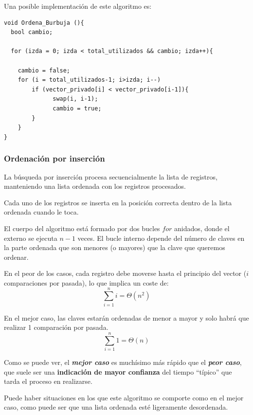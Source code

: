 \documentclass[10pt,a4paper,spanish]{report}
\theoremstyle{definition}
\theoremstyle{remark}
\begin{document}
 Una posible implementación de este algoritmo es:

 \begin{verbatim}
void Ordena_Burbuja (){
  bool cambio;

  for (izda = 0; izda < total_utilizados && cambio; izda++){

    cambio = false;
    for (i = total_utilizados-1; i>izda; i--)
        if (vector_privado[i] < vector_privado[i-1]){
              swap(i, i-1);
              cambio = true;
        }
    }
}
\end{verbatim}

\subsubsection{\textcolor[rgb]{0.2,0.5,0.5}Ordenación por inserción}

La búsqueda por inserción procesa secuencialmente la lista de registros, manteniendo una lista ordenada con los registros procesados.

Cada uno de los registros se inserta en la posición correcta dentro de la lista ordenada cuando le toca.

El cuerpo del algoritmo está formado por dos bucles $for$ anidados, donde el externo se ejecuta $n-1$ veces. El bucle interno depende del número de claves en la parte ordenada que son menores (o mayores) que la clave que queremos ordenar.

En el peor de los casos, cada registro debe moverse hasta el principio del vector ($i$ comparaciones por pasada), lo que implica un coste de:
\begin{displaymath}
    \sum_{i=1}^n i = \Theta (n^2)
\end{displaymath}

En el mejor caso, las claves estarán ordenadas de menor a mayor y solo habrá que realizar 1 comparación por pasada.
\begin{displaymath}
    \sum_{i=1}^n 1 = \Theta (n)
\end{displaymath}

Como se puede ver, el \textit{\textbf{\textcolor[rgb]{0.2,0.5,0.5}{mejor caso}}} es muchísimo más rápido que el \textit{\textbf{\textcolor[rgb]{0.2,0.5,0.5}{peor caso}}}, que suele ser una \textbf{\textcolor[rgb]{0.2,0.5,0.5}{indicación de mayor confianza}} del tiempo ``típico'' que tarda el proceso en realizarse.

Puede haber situaciones en los que este algoritmo se comporte como en el mejor caso, como puede ser que una lista ordenada esté ligeramente desordenada. 
\end{document}
